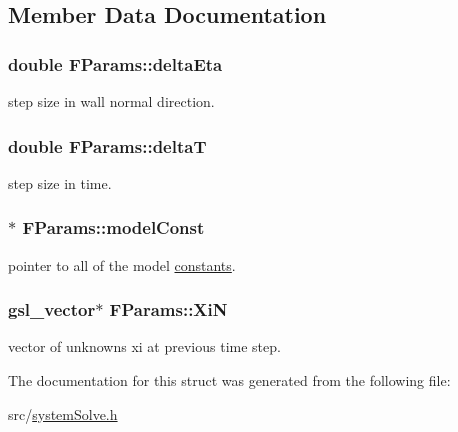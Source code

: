 \subsection{Member Data Documentation}
\hypertarget{structFParams_ad53d99b185bdeb67f5b74e19b0596d82}{
\subsubsection[{deltaEta}]{\setlength{\rightskip}{0pt plus 5cm}double {\bf FParams::deltaEta}}}
\label{structFParams_ad53d99b185bdeb67f5b74e19b0596d82}
step size in wall normal direction. \hypertarget{structFParams_a60254daf4ee837252884402b9a2653d0}{
\subsubsection[{deltaT}]{\setlength{\rightskip}{0pt plus 5cm}double {\bf FParams::deltaT}}}
\label{structFParams_a60254daf4ee837252884402b9a2653d0}
step size in time. \hypertarget{structFParams_a9ad4892b4290ef6ab958f273ff174b27}{
\subsubsection[{modelConst}]{$\ast$ {\bf FParams::modelConst}}}
\label{structFParams_a9ad4892b4290ef6ab958f273ff174b27}
pointer to all of the model \hyperlink{structconstants}{constants}. \hypertarget{structFParams_abf2e0595af66a5282a7cfc0a9e9d7a9f}{
\subsubsection[{XiN}]{\setlength{\rightskip}{0pt plus 5cm}gsl\_\-vector$\ast$ {\bf FParams::XiN}}}
\label{structFParams_abf2e0595af66a5282a7cfc0a9e9d7a9f}
vector of unknowns xi at previous time step. 

The documentation for this struct was generated from the following file:\begin{DoxyCompactItemize}
\item 
src/\hyperlink{systemSolve_8h}{systemSolve.h}\end{DoxyCompactItemize}
